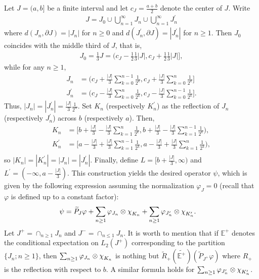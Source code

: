 \documentclass[psamsfonts]{amsart}
\newcommand*{\bigchi}{\mbox{\large$\chi$}}
\begin{document}
  
    Let $J = (a,b]$ be a finite interval and let $c_J = \frac{a+b}{2}$ denote the center of $J$. Write 
    \begin{align*}
        J = J_0 \cup \bigcup_{n=1}^\infty J_n \cup \bigcup_{n=1}^\infty J_n^\prime
    \end{align*}
    where $d(J_n, \partial J) = |J_n|$ for $n \geq 0$ and $d(J_n^\prime,\partial J) = |J_n^\prime|$ for $n \geq 1$. Then $J_0$ coincides with the middle third of $J$, that is,
    \begin{align*}
        J_0 = \frac{1}{3} J = \big( c_J - \frac{1}{2} \frac{1}{3} |J|, c_J + \frac{1}{2} \frac{1}{3} |J|\big],
    \end{align*}
    while for any $n \geq 1$,
    \begin{align*}
        J_n &= \big(c_J + \frac{|J|}{3} \sum_{k=0}^{n-1} \frac{1}{2^k}, c_J + \frac{|J|}{3} \sum_{k=0}^{n} \frac{1}{2^k} \big] \\
        J_n^\prime &= \big( c_J - \frac{|J|}{3} \sum_{k=0}^{n} \frac{1}{2^k} , c_J - \frac{|J|}{3} \sum_{k=0}^{n-1} \frac{1}{2^k} \big].
    \end{align*}
    Thus, $|J_n| = |J_n^\prime| = \frac{|J|}{3}\frac{1}{2^n}$. Set $K_n$ (respectively $K_n^\prime$) as the reflection of $J_n$ (respectively $J_n^\prime$) across $b$ (respectively $a$). Then,
    \begin{align*}
        K_n &= \big[ b + \frac{|J|}{3} - \frac{|J|}{3} \sum_{k=1}^n \frac{1}{2^k}, b + \frac{|J|}{3} - \frac{|J|}{3} \sum_{k=1}^{n-1} \frac{1}{2^k} \big), \\
        K_n^\prime &= \big[ a - \frac{|J|}{3} + \frac{|J|}{3} \sum_{k=1}^{n-1} \frac{1}{2^k}, a - \frac{|J|}{3} + \frac{|J|}{3} \sum_{k=1}^{n} \frac{1}{2^k} \big), \\
    \end{align*}
    so $|K_n| = |K_n^\prime| = |J_n| = |J_n^\prime|$. Finally, define $L = [b + \frac{|J|}{3}, \infty)$ and $L^\prime = (-\infty, a - \frac{|J|}{3})$. This construction yields the desired operator $\psi$, which is given by the following expression assuming the normalization $\varphi_J=0$ (recall that $\varphi$ is defined up to a constant factor):
    \begin{align*}
        \psi &= \widetilde{P}_J \varphi + \sum_{n \geq 1} \varphi_{J_n} \otimes \bigchi_{K_n}  + \sum_{n \geq 1} \varphi_{J_n^\prime} \otimes \bigchi_{K_n^\prime}.  
    \end{align*}
    Let $J^+=\cap_{n\geq 1} J_n$ and $J^-=\cap_{n\leq 1}J_n$. It is worth
    to mention that if $\mathbb E^+$ denotes the conditional
    expectation on $L_2(J^+)$ corresponding to the partition
    $\{J_n; n\geq1\}$, then
    $\sum_{n \geq 1} \varphi_{J_n} \otimes \bigchi_{K_n}$ is nothing but $
    \widetilde R_+ (\widetilde {\mathbb E^+}) (\widetilde{P}_{J^+} \varphi)$ where $R_+$ is the reflection with respect to $b$. A similar formula holds for $\sum_{n \geq 1} \varphi_{J_n^\prime} \otimes \bigchi_{K_n^\prime}$.
\end{document}
